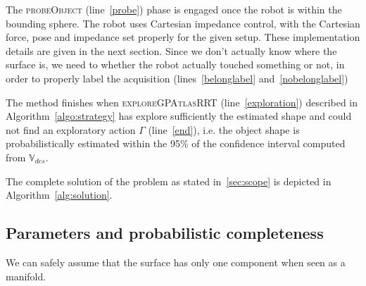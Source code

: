 The \textsc{probeObject} (line~\ref{probe}) phase is engaged once the robot is within the bounding sphere. The robot uses Cartesian impedance control, with the Cartesian force, pose and impedance set properly for the given setup. These implementation details are given in the next section. Since we don't actually know where the surface is, we need to whether the robot actually touched something or not, in order to properly label the acquisition (lines~\ref{belonglabel} and~\ref{nobelonglabel}) 

The method finishes when \textsc{exploreGPAtlasRRT} (line~\ref{exploration}) described in Algorithm~\ref{algo:strategy} has explore sufficiently the estimated shape and could not find an exploratory action $\Gamma$ (line~\ref{end}), i.e. the object shape is probabilistically estimated within the 95\% of the confidence interval computed from $\mathbb{V}_{des}$. 

The complete solution of the problem as stated in~\ref{sec:scope} is depicted in Algorithm~\ref{alg:solution}.

\subsection{Parameters  and probabilistic completeness}
\label{sec:analsys}

We can safely assume that the surface has only one component when seen as a manifold.
